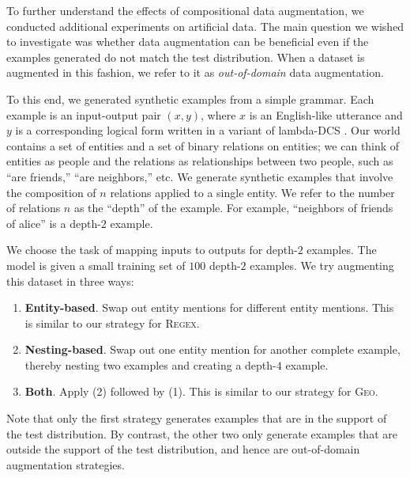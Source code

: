 \documentclass[11pt,letterpaper]{article}
\newcommand{\regex}{\textsc{Regex}\xspace}
\newcommand{\geo}{\textsc{Geo}\xspace}
\begin{document}

To further understand the effects of compositional data augmentation,
we conducted additional experiments on artificial data.
The main question we wished to investigate was whether
data augmentation can be beneficial even if the examples generated
do not match the test distribution.
When a dataset is augmented in this fashion, we refer to it
as \emph{out-of-domain} data augmentation.

To this end, we generated synthetic examples from a simple grammar.
Each example is an input-output pair $(x, y)$, where
$x$ is an English-like utterance and $y$ is a corresponding
logical form written in a variant of lambda-DCS \cite{liang2013lambdadcs}.
Our world contains a set of entities and a set of binary relations
on entities; we can think of entities as people
and the relations as relationships between two people, such as ``are friends,''
``are neighbors,'' etc.
We generate synthetic examples that involve the 
composition of $n$ relations applied to a single entity.  
We refer to the number of relations $n$ as the ``depth'' of the example.
For example, ``neighbors of friends of alice''
is a depth-$2$ example.

We choose the task of mapping inputs to outputs for depth-$2$ examples.
The model is given a small training set of $100$ depth-$2$ examples.
We try augmenting this dataset in three ways:
\begin{enumerate}
  \item \textbf{Entity-based}.  
    Swap out entity mentions for different entity mentions.
    This is similar to our strategy for \regex.
  \item \textbf{Nesting-based}.  
    Swap out one entity mention for another complete example,
    thereby nesting two examples and creating a depth-$4$ example.
  \item \textbf{Both}.  
    Apply (2) followed by (1).
    This is similar to our strategy for \geo.
\end{enumerate}
Note that only the first strategy generates examples
that are in the support of the test distribution.
By contrast, the other two only generate examples that are
outside the support of the test distribution,
and hence are out-of-domain augmentation strategies.
\end{document}
